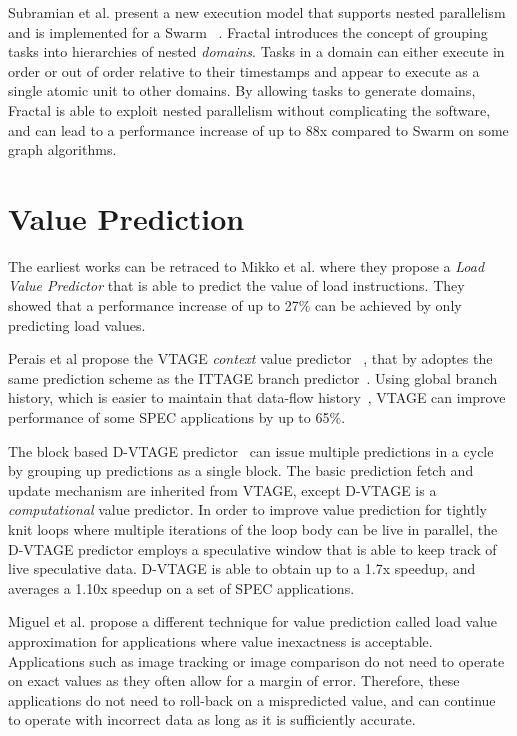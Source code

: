 Subramian et al. present a new execution model that supports nested parallelism and is implemented for a Swarm~\cite{fractal2017} .
Fractal introduces the concept of grouping tasks into hierarchies of nested \textit{domains}.
Tasks in a domain can either execute in order or out of order relative to their timestamps and appear to execute as a single atomic unit to other domains.
By allowing tasks to generate domains, Fractal is able to exploit nested parallelism without complicating the software, and can lead to a performance increase of up to 88x compared to Swarm on some graph algorithms.

\section{Value Prediction}
The earliest works can be retraced to Mikko et al. where they propose a \textit{Load Value Predictor} \cite{lipasti96valpred} that is able to predict the value of load instructions.
They showed that a performance increase of up to 27\% can be achieved by only predicting load values.

Perais et al propose the VTAGE \textit{context} value predictor ~\cite{peraisVTAGE2014}, that by adoptes the same prediction scheme as the ITTAGE branch predictor~\cite{SeznecITTAGE}.
Using global branch history, which is easier to maintain that data-flow history~\cite{peraisVTAGE2014}, VTAGE can improve performance of some SPEC applications by up to 65\%.

The block based D-VTAGE predictor~\cite{peraisBeBop2015} can issue multiple predictions in a cycle by grouping up predictions as a single block.
The basic prediction fetch and update mechanism are inherited from VTAGE, except D-VTAGE is a \textit{computational} value predictor.
In order to improve value prediction for tightly knit loops where multiple iterations of the loop body can be live in parallel, the D-VTAGE predictor employs a speculative window that is able to keep track of live speculative data.
D-VTAGE is able to obtain up to a 1.7x speedup, and averages a 1.10x speedup on a set of SPEC applications. 

Miguel et al. propose a different technique for value prediction called load value approximation \cite{miguel2014LoadVal} for applications where value inexactness is acceptable.
Applications such as image tracking or image comparison do not need to operate on exact values as they often allow for a margin of error.
Therefore, these applications do not need to roll-back on a mispredicted value, and can continue to operate with incorrect data as long as it is sufficiently accurate.

